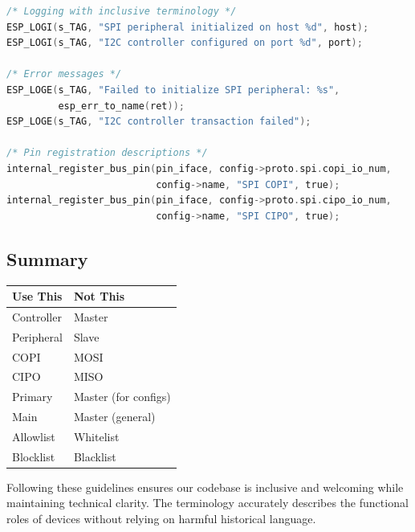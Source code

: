 \begin{lstlisting}[language=C]
/* Logging with inclusive terminology */
ESP_LOGI(s_TAG, "SPI peripheral initialized on host %d", host);
ESP_LOGI(s_TAG, "I2C controller configured on port %d", port);

/* Error messages */
ESP_LOGE(s_TAG, "Failed to initialize SPI peripheral: %s",
         esp_err_to_name(ret));
ESP_LOGE(s_TAG, "I2C controller transaction failed");

/* Pin registration descriptions */
internal_register_bus_pin(pin_iface, config->proto.spi.copi_io_num,
                          config->name, "SPI COPI", true);
internal_register_bus_pin(pin_iface, config->proto.spi.cipo_io_num,
                          config->name, "SPI CIPO", true);
\end{lstlisting}

\subsection{Summary}

\begin{center}
\begin{tabular}{|l|l|}
\hline
\textbf{Use This} & \textbf{Not This} \\
\hline
Controller & Master \\
\hline
Peripheral & Slave \\
\hline
COPI & MOSI \\
\hline
CIPO & MISO \\
\hline
Primary & Master (for configs) \\
\hline
Main & Master (general) \\
\hline
Allowlist & Whitelist \\
\hline
Blocklist & Blacklist \\
\hline
\end{tabular}
\end{center}

Following these guidelines ensures our codebase is inclusive and welcoming while maintaining technical clarity. The terminology accurately describes the functional roles of devices without relying on harmful historical language.

